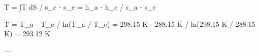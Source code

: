 T̄ = ∫T dS / s_c - s_e = h_a - h_e / s_a - s_e  

T̄ = T_a - T_e / ln(T_a / T_e)  
= 298.15 K - 288.15 K / ln(298.15 K / 288.15 K)  
= 293.12 K  

---